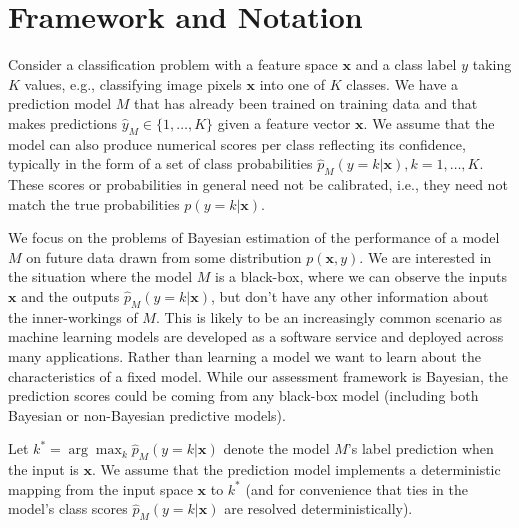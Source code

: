 \documentclass{article}
\newcommand{\ux}{{\mathbf{x}}}
\begin{document}
\section{Framework and Notation}

Consider a classification problem with a feature space $\ux$ and a class label $y$ taking $K$ values, e.g., classifying image pixels $\ux$ into one of $K$ classes.
We have a prediction model $M$ that has already been trained on training data and that makes predictions $\hat{y}_M \in \{1, \ldots, K\}$ given a feature vector $\ux$.
We assume that the model can also produce numerical scores per class reflecting its confidence, typically in the form of a set of class probabilities $\hat{p}_M(y = k | \ux), k = 1,\ldots,K$.
These scores or probabilities in general need not be calibrated, i.e., they need not match the true probabilities $p(y=k | \ux)$.

We focus on the problems of Bayesian estimation of the performance of a model $M$ on future data drawn from some distribution $p(\ux,y)$.
We are interested in the situation where the model $M$ is a black-box, where we can observe the inputs $\ux$ and the outputs $\hat{p}_M(y = k | \ux)$, but don't have any other information about the inner-workings of $M$. 
This is likely to be an increasingly common scenario as machine learning models are developed as a software service and deployed across many applications. Rather than learning a model we want to learn about the characteristics of a fixed model.
While our assessment framework is Bayesian, 
the prediction scores could be coming from any black-box model (including both Bayesian or non-Bayesian predictive models).

  
Let $k^* = \arg \max_k \hat{p}_M(y = k | \ux)$ denote the model $M$'s label prediction when the input is $\ux$.
We assume that the prediction model implements a deterministic mapping from the input space $\ux$ to $k^*$ (and for convenience that ties in the model's class scores $\hat{p}_M(y = k | \ux)$ are resolved deterministically).  
\end{document}
